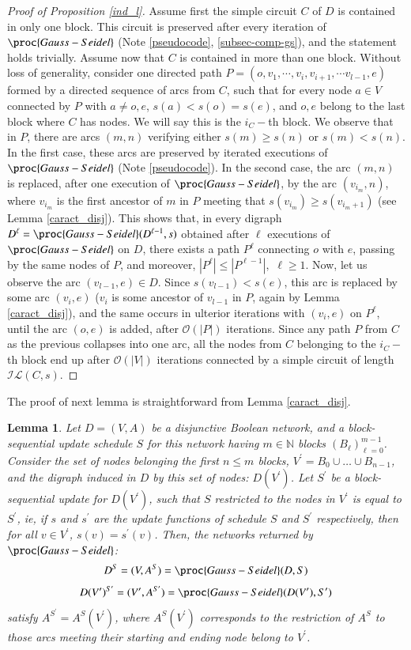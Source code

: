 \documentclass[preprint,12pt]{elsarticle}
\newtheorem {lema}[teo]{Lemma}
\begin{document}
\begin{proof}[Proof of Proposition \ref{ind_l}]
Assume first the simple circuit $C$ of $D$ is contained in only one block. This circuit is preserved after every iteration of $\proc{Gauss-Seidel}$ (Note \ref{pseudocode}, \ref{subsec-comp-gs}), and the statement holds trivially. Assume now that $C$ is contained in more than one block. Without loss of generality, consider one directed path $P=(o,v_1,\cdots,v_i,v_{i+1},\cdots v_{l-1},e)$ formed by a directed sequence of arcs from $C$, such that for every node $a \in V$ connected by $P$ with $a\neq o,e$, $s(a)<s(o)=s(e)$, and $o,e$ belong to the last block where $C$ has nodes. We will say this is the $i_C-$th block. We observe that in $P$, there are arcs $(m,n)$ verifying either $s(m)\geq s(n)$ or $s(m) < s(n)$. In the first case, these arcs are preserved by iterated executions of $\proc{Gauss-Seidel}$ (Note \ref{pseudocode}). In the second case, the arc $(m,n)$ is replaced, after one execution of $\proc{Gauss-Seidel}$, by the arc $(v_{i_m},n)$, where $v_{i_m}$ is the first ancestor of $m$ in $P$ meeting that $s(v_{i_m}) \geq s(v_{i_m +1})$ (see Lemma \ref{caract_disj}). This shows that, in every digraph $D^{\ell}=\proc{Gauss-Seidel}(D^{\ell -1},s)$ obtained after $\ell$ executions of $\proc{Gauss-Seidel}$ on $D$, there exists a path $P^{\ell}$ connecting $o$ with $e$, passing by the same nodes of $P$, and moreover, $|P^{\ell}|\leq |P^{\ell -1}|,$ $\ell \geq 1$. Now, let us observe the arc $(v_{l-1},e) \in D$. Since $s(v_{l-1}) < s(e)$, this arc is replaced by some arc $(v_i,e)$ ($v_i$ is some ancestor of $v_{l-1}$ in $P$, again by Lemma \ref{caract_disj}), and the same occurs in ulterior iterations with $(v_i,e)$ on $P^{\ell}$, until the arc $(o,e)$ is added, after $\mathcal{O}(|P|)$ iterations. Since any path $P$ from $C$ as the previous collapses into one arc, all the nodes from $C$ belonging to the $i_C-$th block end up after $\mathcal{O}(|V|)$ iterations connected by a simple circuit of length $\mathcal{IL}(C,s)$.
\end{proof} 

The proof of next lemma is straightforward from Lemma \ref{caract_disj}.
\begin{lema}\label{varios}
Let $D=(V,A)$ be a disjunctive Boolean network, and a block-sequential update schedule $S$ for this network having $m \in \mathbb{N}$ blocks $(B_{\ell})_{\ell=0}^{m-1}$. Consider the set of nodes belonging the first $n\leq m$ blocks, $V^{\prime}=B_0\cup \ldots \cup B_{n-1}$, and the digraph induced in $D$ by this set of nodes: $D(V^{\prime})$. Let $S^{\prime}$ be a block-sequential update for $D(V^{\prime})$, such that $S$ restricted to the nodes in $V^{\prime}$ is equal to $S^{\prime}$, ie, if $s$ and $s^{\prime}$ are the update functions of schedule $S$ and $S^{\prime}$ respectively, then for all $v \in V^{\prime}$, $s(v)=s^{\prime}(v)$. Then, the networks returned by $\proc{Gauss-Seidel}$:
$$D^S=(V,A^S)=\proc{Gauss-Seidel}(D,S)$$
$$D(V^{\prime})^{S^{\prime}}=(V^{\prime},A^{S^{\prime}})=\proc{Gauss-Seidel}(D(V^{\prime}),S^{\prime})$$
satisfy $A^{S^{\prime}}=A^S(V^{\prime})$, where $A^S(V^{\prime})$ corresponds to the restriction of $A^S$ to those arcs meeting their starting and ending node belong to $V^{\prime}$.   
\end{lema}
\end{document}

